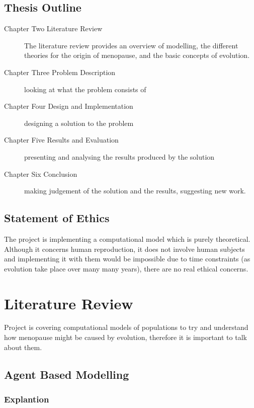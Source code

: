 \documentclass[authoryearcitations]{UoYCSproject}
\begin{document}
\section{Thesis Outline}
\begin{description}

\item[Chapter Two Literature Review] The literature review provides an overview of modelling, the different theories for the origin of menopause, and the basic concepts of evolution.
\item[Chapter Three Problem Description] looking at what the problem consists of

\item[Chapter Four Design and Implementation] designing a solution to the problem

\item[Chapter Five Results and Evaluation] presenting and analysing the results produced by the solution

\item[Chapter Six Conclusion] making judgement of the solution and the results, suggesting new work.

\end{description}

\section{Statement of Ethics}
The project is implementing a computational model which is purely theoretical. Although it concerns human reproduction, it does not involve human subjects and implementing it with them would be impossible due to time constraints (as evolution take place over many many years), there are no real ethical concerns.

\chapter{Literature Review}
\label{cha:Literature Review}
Project is covering computational models of populations to try and understand how menopause might be caused by evolution, therefore it is important to talk about them.

\section{Agent Based Modelling}

\subsection{Explantion}
\end{document}
